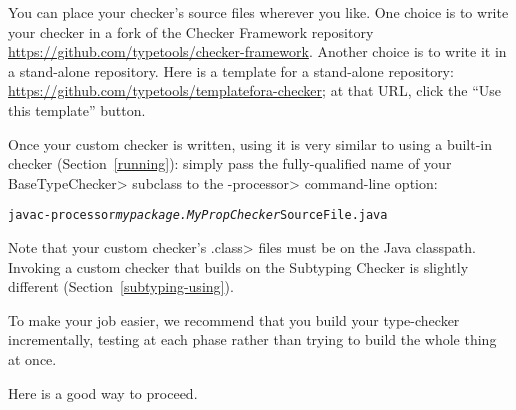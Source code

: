 
You can place your checker's source files wherever you like.
One choice is to write your checker in a fork of the Checker Framework
repository \url{https://github.com/typetools/checker-framework}.
Another choice is to write it in a stand-alone repository.  Here is a
template for a stand-alone repository:
\url{https://github.com/typetools/templatefora-checker}; at that URL,
click the ``Use this template'' button.


Once your custom checker is written, using it is very similar to using a
built-in checker (Section~\ref{running}):
simply pass the fully-qualified name of your \<BaseTypeChecker>
subclass to the \<-processor> command-line option:
\begin{alltt}
  javac -processor \textit{mypackage.MyPropChecker} SourceFile.java
\end{alltt}
Note that your custom checker's
\<.class> files must be on the Java classpath.
Invoking a custom checker that builds on
the Subtyping Checker is slightly different (Section~\ref{subtyping-using}).




To make your job easier, we recommend that you build your type-checker
incrementally, testing at each phase rather than trying to build the whole
thing at once.

Here is a good way to proceed.

